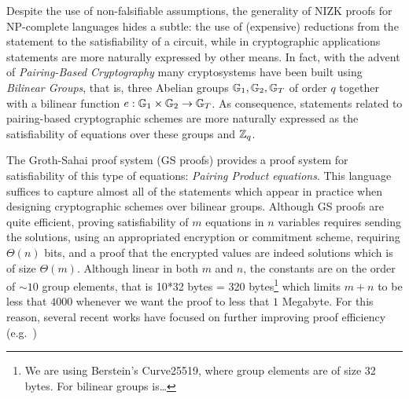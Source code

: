 Despite the use of non-falsifiable assumptions, the generality of NIZK proofs for NP-complete languages hides a subtle: the use of (expensive) reductions
from the statement to the satisfiability of a circuit, while in cryptographic applications statements are more naturally expressed by other means.
In fact, with the advent of \emph{Pairing-Based Cryptography} many cryptosystems have been built using \emph{Bilinear Groups}, that is, three Abelian groups $\mathbb{G}_1,\mathbb{G}_2,\mathbb{G}_T$ of order $q$ together with a bilinear function $e:\mathbb{G}_1\times\mathbb{G}_2\to\mathbb{G}_T$. As consequence,
statements related to pairing-based cryptographic schemes are more naturally expressed as the satisfiability of equations over these groups and $\mathbb{Z}_q$.

The Groth-Sahai proof system (GS proofs) \cite{SIAMJC:GroSah12} 
  provides a proof system for satisfiability of this type of equations: \emph{Pairing Product equations}.
  This language suffices to capture almost all of the 
  statements which appear 
  in practice when designing cryptographic schemes over bilinear groups.  
Although GS proofs are quite efficient, proving satisfiability of $m$ equations in $n$ variables requires 
sending the solutions, using an appropriated encryption or commitment scheme, requiring $\Theta(n)$ bits, and a proof that the encrypted values are indeed solutions which is of size $\Theta(m)$. Although linear in both $m$ and $n$, the constants are on the order of $\sim 10$ group elements, that is 10*32 bytes = 320 bytes\footnote{We are using Berstein's Curve25519, where group elements are of size 32 bytes. For bilinear groups is\ldots}  which limits $m+n$ to be less that $4000$ whenever we want the proof to less that $1$ Megabyte. For this reason, several recent works 
 have focused on further improving proof efficiency 
 (e.g.\ \cite{PKC:EscGro14,C:EHKRV13,TCC:Rafols15})



